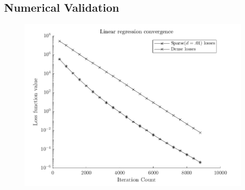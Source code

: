 \subsection{Numerical Validation}

\begin{figure}[!htb]
  \centering
  \includegraphics[width=.8\textwidth]{./resources/convergence}
\end{figure}
